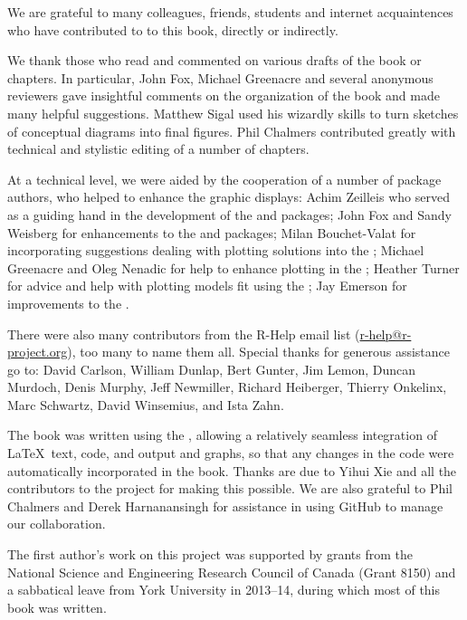 We are grateful to many colleagues, friends, students and internet acquaintences who have contributed to
to this book, directly or indirectly.

We thank those who read and commented on various drafts of the book or chapters.
In particular, John Fox, Michael Greenacre and several anonymous reviewers gave
insightful comments on the organization of the book and made many helpful suggestions.
Matthew Sigal used his wizardly skills to turn sketches of conceptual diagrams into
final figures. Phil Chalmers contributed greatly with technical and stylistic editing
of a number of chapters.

At a technical level, we were aided by the cooperation of a number of \R package authors, who
helped to enhance the graphic displays:
Achim Zeilleis who served as a guiding hand in the development of the  and  packages;
John Fox and Sandy Weisberg for enhancements to the  and  packages;
Milan Bouchet-Valat for incorporating suggestions dealing with plotting  solutions into the ;
Michael Greenacre and Oleg Nenadic for help to enhance plotting in the ;
Heather Turner for advice and help with plotting models fit using the ;
Jay Emerson for improvements to the .

There were also many contributors from the R-Help email list (\url{r-help@r-project.org}), too many to name them all.
Special thanks for generous assistance go to:
David Carlson,
William Dunlap,
Bert Gunter,
Jim Lemon,
Duncan Murdoch,
Denis Murphy,
Jeff Newmiller,
Richard Heiberger,
Thierry Onkelinx,
Marc Schwartz,
David Winsemius, and
Ista Zahn.

The book was written using the , allowing a relatively seamless 
integration of \LaTeX\  text, \R code, and \R output and graphs, so that any changes
in the code were automatically incorporated in the book.
Thanks are due to Yihui Xie and all the contributors to the  project
for making this possible.  We are also grateful to Phil Chalmers and Derek Harnanansingh
for assistance in using GitHub to manage our collaboration.

The first author's work on this project was supported by grants from the
National Science and Engineering Research Council of Canada (Grant 8150)
and a sabbatical leave from York University in 2013--14, during which most
of this book was written.

